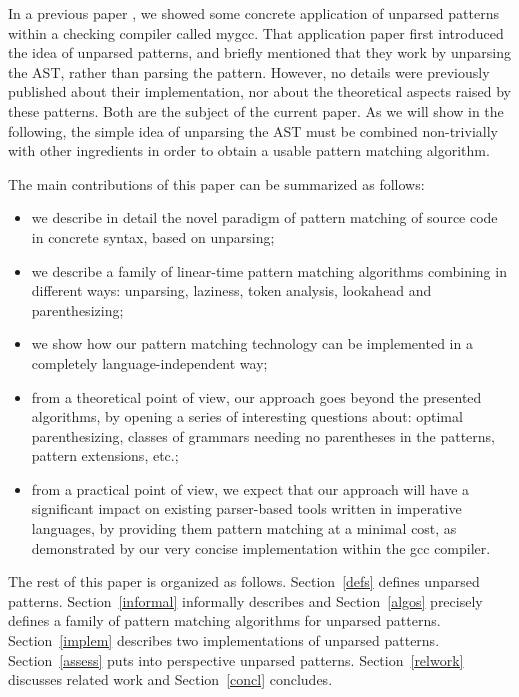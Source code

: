 In a previous paper \cite{ppdp}, we showed some concrete application
of unparsed patterns within a checking compiler called mygcc. That
application paper first introduced the idea of unparsed patterns, and
briefly mentioned that they work by unparsing the AST, rather than
parsing the pattern. However, no details were previously published
about their implementation, nor about the theoretical aspects raised
by these patterns. Both are the subject of the current paper. As we
will show in the following, the simple idea of unparsing the AST must
be combined non-trivially with other ingredients in order to obtain
a usable pattern matching algorithm.

The main contributions of this paper can be summarized as follows:
\begin{itemize}
\item we describe in detail the novel paradigm of pattern matching of
source code in concrete syntax, based on unparsing;
\item we describe a family of linear-time pattern matching algorithms
combining in different ways: unparsing, laziness, token analysis,
lookahead and parenthesizing;
\item we show how our pattern matching technology can be implemented
in a completely language-independent way;
\item from a theoretical point of view, our approach goes beyond the
presented algorithms, by opening a series of interesting questions
about: optimal parenthesizing, classes of grammars needing no
parentheses in the patterns, pattern extensions, etc.;
\item from a practical point of view, we expect that our approach will
have a significant impact on existing parser-based tools written in
imperative languages, by providing them pattern matching at a minimal
cost, as demonstrated by our very concise implementation within the
gcc compiler.
\end{itemize}

The rest of this paper is organized as follows. Section~\ref{defs}
defines unparsed patterns. Section~\ref{informal} informally describes
and Section~\ref{algos} precisely defines a family of pattern matching
algorithms for unparsed patterns. Section~\ref{implem} describes two
implementations of unparsed patterns. Section~\ref{assess} puts into
perspective unparsed patterns. Section~\ref{relwork} discusses related
work and Section~\ref{concl} concludes.
